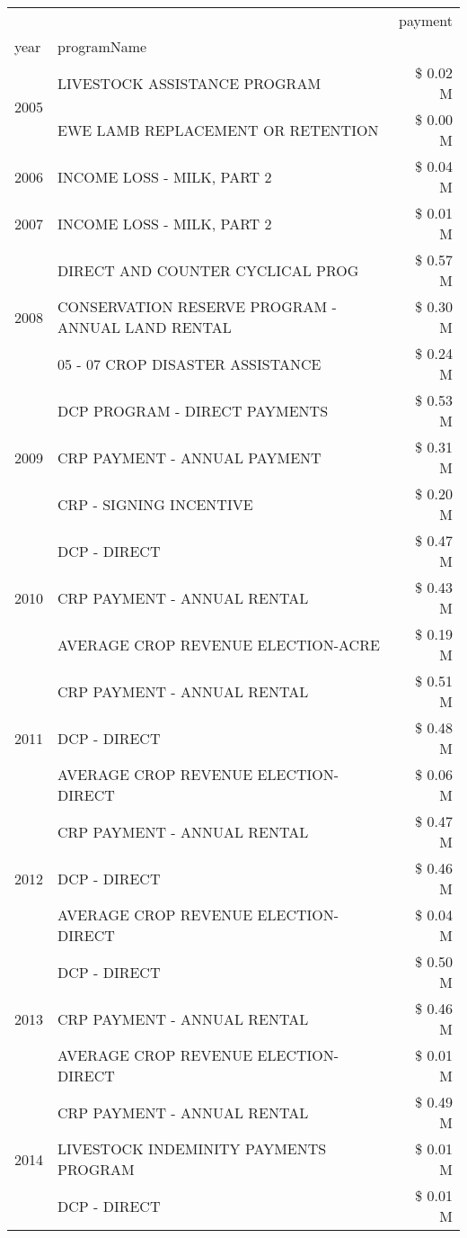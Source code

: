 \begin{tabular}{llr}
\toprule
 &  & payment \\
year & programName &  \\
\midrule
\multirow[t]{2}{*}{2005} & LIVESTOCK ASSISTANCE PROGRAM & \$ 0.02 M \\
 & EWE LAMB REPLACEMENT OR RETENTION & \$ 0.00 M \\
\cline{1-3}
2006 & INCOME LOSS - MILK, PART 2 & \$ 0.04 M \\
\cline{1-3}
2007 & INCOME LOSS - MILK, PART 2 & \$ 0.01 M \\
\cline{1-3}
\multirow[t]{3}{*}{2008} & DIRECT AND COUNTER CYCLICAL PROG & \$ 0.57 M \\
 & CONSERVATION RESERVE PROGRAM - ANNUAL LAND RENTAL & \$ 0.30 M \\
 & 05 - 07 CROP DISASTER ASSISTANCE & \$ 0.24 M \\
\cline{1-3}
\multirow[t]{3}{*}{2009} & DCP PROGRAM - DIRECT PAYMENTS & \$ 0.53 M \\
 & CRP PAYMENT - ANNUAL PAYMENT & \$ 0.31 M \\
 & CRP - SIGNING INCENTIVE & \$ 0.20 M \\
\cline{1-3}
\multirow[t]{3}{*}{2010} & DCP - DIRECT & \$ 0.47 M \\
 & CRP PAYMENT - ANNUAL RENTAL & \$ 0.43 M \\
 & AVERAGE CROP REVENUE ELECTION-ACRE & \$ 0.19 M \\
\cline{1-3}
\multirow[t]{3}{*}{2011} & CRP PAYMENT - ANNUAL RENTAL & \$ 0.51 M \\
 & DCP - DIRECT & \$ 0.48 M \\
 & AVERAGE CROP REVENUE ELECTION-DIRECT & \$ 0.06 M \\
\cline{1-3}
\multirow[t]{3}{*}{2012} & CRP PAYMENT - ANNUAL RENTAL & \$ 0.47 M \\
 & DCP - DIRECT & \$ 0.46 M \\
 & AVERAGE CROP REVENUE ELECTION-DIRECT & \$ 0.04 M \\
\cline{1-3}
\multirow[t]{3}{*}{2013} & DCP - DIRECT & \$ 0.50 M \\
 & CRP PAYMENT - ANNUAL RENTAL & \$ 0.46 M \\
 & AVERAGE CROP REVENUE ELECTION-DIRECT & \$ 0.01 M \\
\cline{1-3}
\multirow[t]{3}{*}{2014} & CRP PAYMENT - ANNUAL RENTAL & \$ 0.49 M \\
 & LIVESTOCK INDEMINITY PAYMENTS PROGRAM & \$ 0.01 M \\
 & DCP - DIRECT & \$ 0.01 M \\

\end{tabular}
